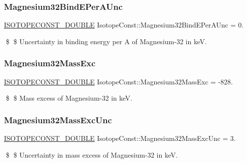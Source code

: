 \subsubsection{\texorpdfstring{Magnesium32\+Bind\+E\+Per\+A\+Unc}{Magnesium32BindEPerAUnc}}
{\footnotesize\ttfamily \mbox{\hyperlink{group___isotope_const-_macros_ga8f45a7272ce02c0b4c65c44636ed719a}{I\+S\+O\+T\+O\+P\+E\+C\+O\+N\+S\+T\+\_\+\+D\+O\+U\+B\+LE}} Isotope\+Const\+::\+Magnesium32\+Bind\+E\+Per\+A\+Unc = 0.}

\$ \$ Uncertainty in binding energy per A of Magnesium-\/32 in keV. \mbox{\label{group___isotope_const-_magnesium-_mg32_ga6c075b8a068310806dfd4e8245c6cc0e}} 
\subsubsection{\texorpdfstring{Magnesium32\+Mass\+Exc}{Magnesium32MassExc}}
{\footnotesize\ttfamily \mbox{\hyperlink{group___isotope_const-_macros_ga8f45a7272ce02c0b4c65c44636ed719a}{I\+S\+O\+T\+O\+P\+E\+C\+O\+N\+S\+T\+\_\+\+D\+O\+U\+B\+LE}} Isotope\+Const\+::\+Magnesium32\+Mass\+Exc = -\/828.}

\$ \$ Mass excess of Magnesium-\/32 in keV. \mbox{\label{group___isotope_const-_magnesium-_mg32_ga8143c19e5ae6cc053a299ff865a62d29}} 
\subsubsection{\texorpdfstring{Magnesium32\+Mass\+Exc\+Unc}{Magnesium32MassExcUnc}}
{\footnotesize\ttfamily \mbox{\hyperlink{group___isotope_const-_macros_ga8f45a7272ce02c0b4c65c44636ed719a}{I\+S\+O\+T\+O\+P\+E\+C\+O\+N\+S\+T\+\_\+\+D\+O\+U\+B\+LE}} Isotope\+Const\+::\+Magnesium32\+Mass\+Exc\+Unc = 3.}

\$ \$ Uncertainty in mass excess of Magnesium-\/32 in keV. \mbox{\label{group___isotope_const-_magnesium-_mg32_ga39af751c7ce221e030b74993ecf1d431}} 
